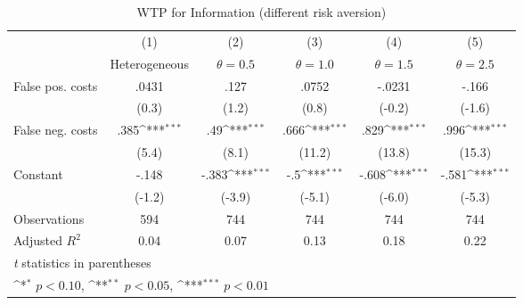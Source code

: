 \begin{table}[htbp]\centering
\def\sym#1{\ifmmode^{#1}\else\(^{#1}\)\fi}
\caption{WTP for Information (different risk aversion)}
\begin{tabular}{l*{5}{c}}
\hline\hline
                &\multicolumn{1}{c}{(1)}&\multicolumn{1}{c}{(2)}&\multicolumn{1}{c}{(3)}&\multicolumn{1}{c}{(4)}&\multicolumn{1}{c}{(5)}\\
                &\multicolumn{1}{c}{Heterogeneous}&\multicolumn{1}{c}{$\theta=0.5$}&\multicolumn{1}{c}{$\theta=1.0$}&\multicolumn{1}{c}{$\theta=1.5$}&\multicolumn{1}{c}{$\theta=2.5$}\\
\hline
False pos. costs&    .0431         &     .127         &    .0752         &   -.0231         &    -.166         \\
                &    (0.3)         &    (1.2)         &    (0.8)         &   (-0.2)         &   (-1.6)         \\
False neg. costs&     .385\sym{***}&      .49\sym{***}&     .666\sym{***}&     .829\sym{***}&     .996\sym{***}\\
                &    (5.4)         &    (8.1)         &   (11.2)         &   (13.8)         &   (15.3)         \\
Constant        &    -.148         &    -.383\sym{***}&      -.5\sym{***}&    -.608\sym{***}&    -.581\sym{***}\\
                &   (-1.2)         &   (-3.9)         &   (-5.1)         &   (-6.0)         &   (-5.3)         \\
\hline
Observations    &      594         &      744         &      744         &      744         &      744         \\
Adjusted \(R^{2}\)&     0.04         &     0.07         &     0.13         &     0.18         &     0.22         \\
\hline\hline
\multicolumn{6}{l}{\footnotesize \textit{t} statistics in parentheses}\\
\multicolumn{6}{l}{\footnotesize \sym{*} \(p<0.10\), \sym{**} \(p<0.05\), \sym{***} \(p<0.01\)}\\
\end{tabular}
\end{table}
